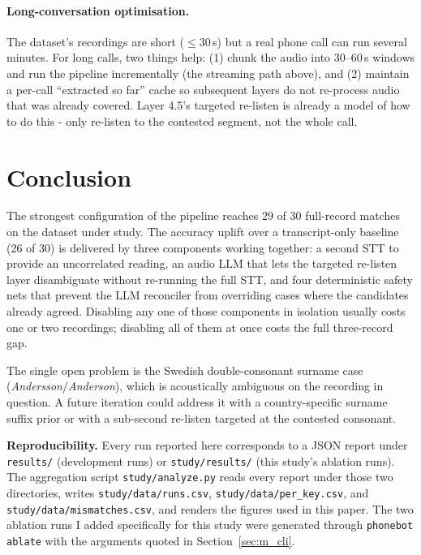 \documentclass[11pt,a4paper]{article}
\begin{document}
\paragraph{Long-conversation optimisation.}
The dataset's recordings are short ($\le$30\,s) but a real phone
call can run several minutes. For long calls, two things help: (1)
chunk the audio into 30--60\,s windows and run the pipeline
incrementally (the streaming path above), and (2) maintain a
per-call ``extracted so far'' cache so subsequent layers do not
re-process audio that was already covered. Layer 4.5's targeted
re-listen is already a model of how to do this - only re-listen
to the contested segment, not the whole call.

\section{Conclusion}

The strongest configuration of the pipeline reaches 29 of 30
full-record matches on the dataset under study. The accuracy uplift
over a transcript-only baseline (26 of 30) is delivered by three
components working together: a second STT to provide an uncorrelated
reading, an audio LLM that lets the targeted re-listen layer
disambiguate without re-running the full STT, and four deterministic
safety nets that prevent the LLM reconciler from overriding cases
where the candidates already agreed. Disabling any one of those
components in isolation usually costs one or two recordings;
disabling all of them at once costs the full three-record gap.

The single open problem is the Swedish double-consonant surname case
(\textit{Andersson}/\textit{Anderson}), which is acoustically
ambiguous on the recording in question. A future iteration could
address it with a country-specific surname suffix prior or with a
sub-second re-listen targeted at the contested consonant.

\vspace{0.7em}
\noindent\textbf{Reproducibility.} Every run reported here
corresponds to a JSON report under \verb|results/| (development
runs) or \verb|study/results/| (this study's ablation runs). The
aggregation script \verb|study/analyze.py| reads every report under
those two directories, writes \verb|study/data/runs.csv|,
\verb|study/data/per_key.csv|, and
\verb|study/data/mismatches.csv|, and renders the figures used in
this paper. The two ablation runs I added specifically for this
study were generated through \verb|phonebot ablate| with the
arguments quoted in Section~\ref{sec:m_cli}.
\end{document}
